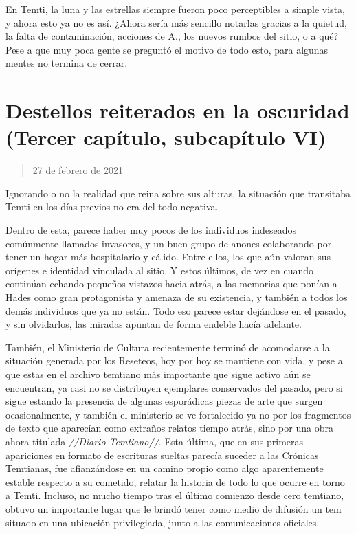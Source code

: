 \documentclass[
  spanish,
]{book}
\begin{document}
En Temti, la luna y las estrellas siempre fueron poco perceptibles a simple vista, y ahora esto ya no es así. ¿Ahora sería más sencillo notarlas gracias a la quietud, la falta de contaminación, acciones de A., los nuevos rumbos del sitio, o a qué? Pese a que muy poca gente se preguntó el motivo de todo esto, para algunas mentes no termina de cerrar.

\hypertarget{destellos-reiterados-en-la-oscuridad-tercer-capuxedtulo-subcapuxedtulo-vi}{%
\section{Destellos reiterados en la oscuridad (Tercer capítulo, subcapítulo VI)}\label{destellos-reiterados-en-la-oscuridad-tercer-capuxedtulo-subcapuxedtulo-vi}}

\begin{quote}
27 de febrero de 2021
\end{quote}

Ignorando o no la realidad que reina sobre sus alturas, la situación que transitaba Temti en los días previos no era del todo negativa.

Dentro de esta, parece haber muy pocos de los individuos indeseados comúnmente llamados invasores, y un buen grupo de anones colaborando por tener un hogar más hospitalario y cálido. Entre ellos, los que aún valoran sus orígenes e identidad vinculada al sitio. Y estos últimos, de vez en cuando continúan echando pequeños vistazos hacia atrás, a las memorias que ponían a Hades como gran protagonista y amenaza de su existencia, y también a todos los demás individuos que ya no están. Todo eso parece estar dejándose en el pasado, y sin olvidarlos, las miradas apuntan de forma endeble hacía adelante.

También, el Ministerio de Cultura recientemente terminó de acomodarse a la situación generada por los Reseteos, hoy por hoy se mantiene con vida, y pese a que estas en el archivo temtiano más importante que sigue activo aún se encuentran, ya casi no se distribuyen ejemplares conservados del pasado, pero si sigue estando la presencia de algunas esporádicas piezas de arte que surgen ocasionalmente, y también el ministerio se ve fortalecido ya no por los fragmentos de texto que aparecían como extraños relatos tiempo atrás, sino por una obra ahora titulada \emph{//Diario Temtiano//}. Esta última, que en sus primeras apariciones en formato de escrituras sueltas parecía suceder a las Crónicas Temtianas, fue afianzándose en un camino propio como algo aparentemente estable respecto a su cometido, relatar la historia de todo lo que ocurre en torno a Temti. Incluso, no mucho tiempo tras el último comienzo desde cero temtiano, obtuvo un importante lugar que le brindó tener como medio de difusión un tem situado en una ubicación privilegiada, junto a las comunicaciones oficiales.
\end{document}
